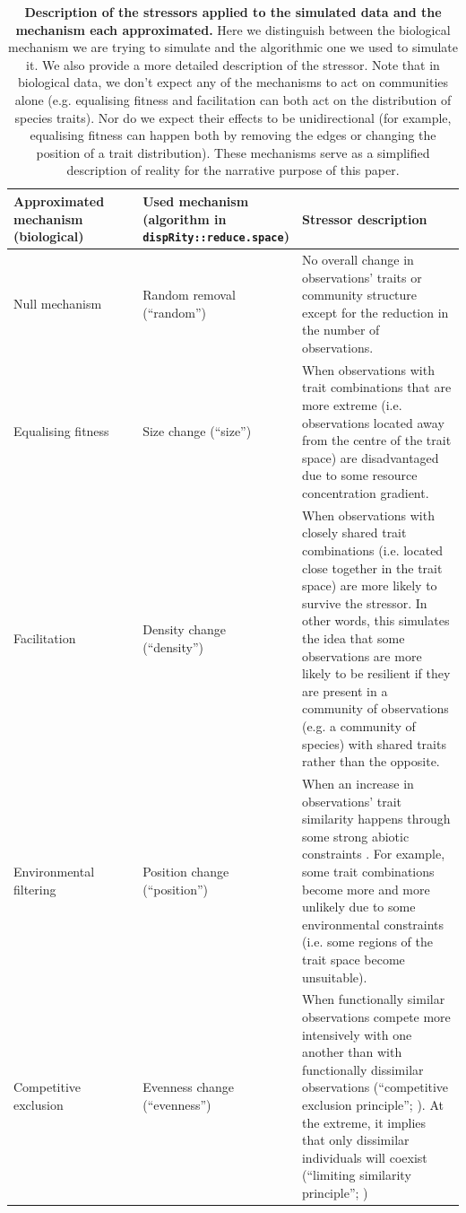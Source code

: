 \documentclass[12pt,letterpaper]{article}
\begin{document}
\begin{table}
\center
\scriptsize
\begin{tabular}{p{0.3\linewidth}|p{0.3\linewidth}|p{0.4\linewidth}}
\textbf{Approximated mechanism (biological)} & \textbf{Used mechanism (algorithm in \texttt{dispRity::reduce.space})} & \textbf{Stressor description}\\
\hline
  Null mechanism & Random removal (``random'') & No overall change in observations' traits or community structure except for the reduction in the number of observations.\\
  Equalising fitness & Size change (``size'') & When observations with trait combinations that are more extreme (i.e. observations located away from the centre of the trait space) are disadvantaged due to some resource concentration gradient. \\
  Facilitation & Density change (``density'') & When observations with closely shared trait combinations (i.e. located close together in the trait space) are more likely to survive the stressor. In other words, this simulates the idea that some observations are more likely to be resilient if they are present in a community of observations (e.g. a community of species) with shared traits rather than the opposite.\\
  Environmental filtering & Position change (``position'') & When an increase in observations' trait similarity happens through some strong abiotic constraints \citep{cornwell2006trait}. For example, some trait combinations become more and more unlikely due to some environmental constraints (i.e. some regions of the trait space become unsuitable).\\
  Competitive exclusion & Evenness change (``evenness'') & When functionally similar observations compete more intensively with one another than with functionally dissimilar observations (``competitive exclusion principle''; \citealt{hardin1960competitive}). At the extreme, it implies that only dissimilar individuals will coexist (``limiting similarity principle''; \citealt{macarthur1967limiting})\\

    \end{tabular}
    \caption{\scriptsize{\textbf{Description of the stressors applied to the simulated data and the mechanism each approximated.} Here we distinguish between the biological mechanism we are trying to simulate and the algorithmic one we used to simulate it. We also provide a more detailed description of the stressor. Note that in biological data, we don't expect any of the mechanisms to act on communities alone (e.g. equalising fitness and facilitation can both act on the distribution of species traits). Nor do we expect their effects to be unidirectional (for example, equalising fitness can happen both by removing the edges or changing the position of a trait distribution). These mechanisms serve as a simplified description of reality for the narrative purpose of this paper.}
}
    \label{Tab:mechanisms}
\end{table}
\end{document}
